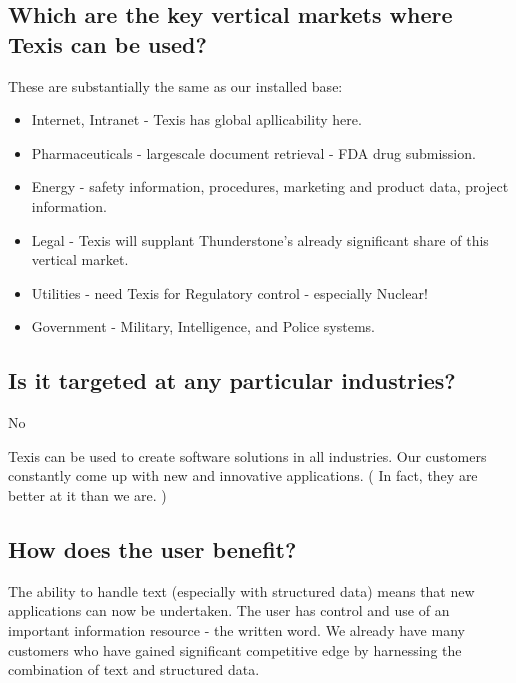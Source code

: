\subsection{Which are the key vertical markets where Texis can be used?}

These are substantially the same as our installed base:
\begin{itemize}
 \item        Internet, Intranet - Texis has global apllicability here.

 \item        Pharmaceuticals - largescale document retrieval - FDA drug submission.

 \item        Energy - safety information, procedures, marketing and product data, project
information.

 \item        Legal - Texis will supplant Thunderstone's  already significant share of this vertical market.

 \item        Utilities - need Texis for Regulatory control - especially Nuclear!

 \item        Government - Military, Intelligence, and Police systems.
\end{itemize}
\subsection{Is it targeted at any particular industries?}

No

Texis can be used to create software solutions in all industries.  Our
customers constantly come up with new and innovative applications.  ( In
fact, they are better at it than we are.  )

\subsection{How does the user benefit?}

The ability to handle text (especially with structured data) means that
new applications can now be undertaken.  The user has control and use of
an important information resource - the written word.  We already have
many customers who have gained significant competitive edge by harnessing
the combination of text and structured data.





